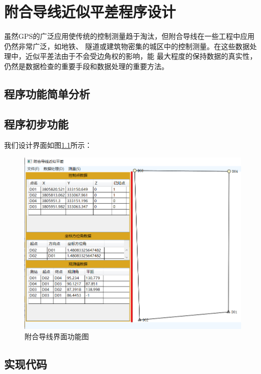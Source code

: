 ﻿%

\chapter{附合导线近似平差程序设计}

虽然GPS的广泛应用使传统的控制测量趋于淘汰，但附合导线在一些工程中应用仍然非常广泛，如地铁、
隧道或建筑物密集的城区中的控制测量。在这些数据处理中，近似平差法由于不会受边角权的影响，能
最大程度的保持数据的真实性，仍然是数据检查的重要手段和数据处理的重要方法。

\section{程序功能简单分析}

\section{程序初步功能}

我们设计界面如图\ref{fig:ctUI01}所示：

\begin{figure}[htbp]
	\centering
	\includegraphics[scale=0.8]{connectingtraverse/ctUI01.png}
	\caption{附合导线界面功能图}
	\label{fig:ctUI01}
\end{figure}

\section{实现代码}

